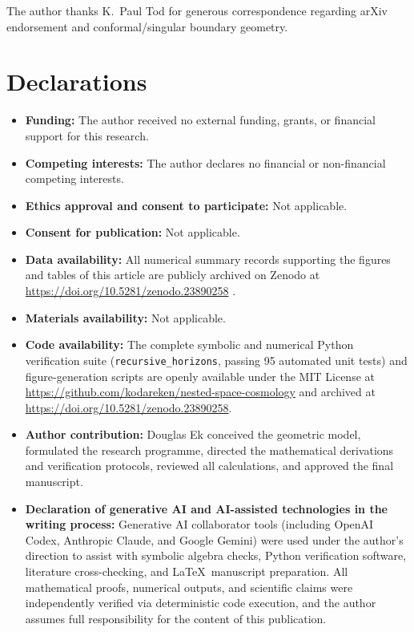\documentclass[pdflatex,sn-mathphys-num]{sn-jnl}
\theoremstyle{thmstyleone}
\theoremstyle{thmstyletwo}
\theoremstyle{thmstylethree}
\begin{document}
\backmatter

The author thanks K.~Paul Tod for generous correspondence regarding arXiv endorsement and conformal/singular boundary geometry.

\section*{Declarations}

\begin{itemize}
\item \textbf{Funding:} The author received no external funding, grants, or financial support for this research.
\item \textbf{Competing interests:} The author declares no financial or non-financial competing interests.
\item \textbf{Ethics approval and consent to participate:} Not applicable.
\item \textbf{Consent for publication:} Not applicable.
\item \textbf{Data availability:} All numerical summary records supporting the figures and tables of this article are publicly archived on Zenodo at \url{https://doi.org/10.5281/zenodo.23890258} \cite{Ek2026Zenodo}.
\item \textbf{Materials availability:} Not applicable.
\item \textbf{Code availability:} The complete symbolic and numerical Python verification suite (\texttt{recursive\_horizons}, passing 95 automated unit tests) and figure-generation scripts are openly available under the MIT License at \url{https://github.com/kodareken/nested-space-cosmology} and archived at \url{https://doi.org/10.5281/zenodo.23890258}.
\item \textbf{Author contribution:} Douglas Ek conceived the geometric model, formulated the research programme, directed the mathematical derivations and verification protocols, reviewed all calculations, and approved the final manuscript.
\item \textbf{Declaration of generative AI and AI-assisted technologies in the writing process:} Generative AI collaborator tools (including OpenAI Codex, Anthropic Claude, and Google Gemini) were used under the author's direction to assist with symbolic algebra checks, Python verification software, literature cross-checking, and \LaTeX\ manuscript preparation. All mathematical proofs, numerical outputs, and scientific claims were independently verified via deterministic code execution, and the author assumes full responsibility for the content of this publication.
\end{itemize}


\end{document}

